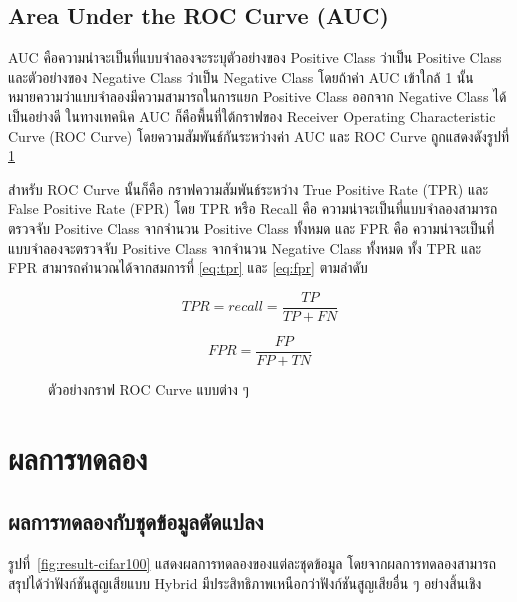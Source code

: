 \subsection{Area Under the ROC Curve (AUC)}
AUC คือความน่าจะเป็นที่แบบจำลองจะระบุตัวอย่างของ Positive Class ว่าเป็น Positive Class และตัวอย่างของ Negative Class ว่าเป็น Negative Class 
โดยถ้าค่า AUC เข้าใกล้ 1 นั้นหมายความว่าแบบจำลองมีความสามารถในการแยก Positive Class ออกจาก Negative Class ได้เป็นอย่างดี 
ในทางเทคนิค AUC ก็คือพื้นที่ใต้กราฟของ Receiver Operating Characteristic Curve (ROC Curve) โดยความสัมพันธ์กันระหว่างค่า AUC และ ROC Curve ถูกแสดงดังรูปที่ \ref{fig:roc} 

สำหรับ ROC Curve นั้นก็คือ กราฟความสัมพันธ์ระหว่าง True Positive Rate (TPR) และ False Positive Rate (FPR) โดย TPR หรือ Recall คือ 
ความน่าจะเป็นที่แบบจำลองสามารถตรวจจับ Positive Class จากจำนวน Positive Class ทั้งหมด และ FPR คือ 
ความน่าจะเป็นที่แบบจำลองจะตรวจจับ Positive Class จากจำนวน Negative Class ทั้งหมด ทั้ง TPR และ FPR สามารถคำนวณได้จากสมการที่ \ref{eq:tpr} และ \ref{eq:fpr} ตามลำดับ

\begin{equation}
  TPR = recall = \frac{TP}{TP + FN}
  \label{eq:tpr}
\end{equation}

\begin{equation}
  FPR = \frac{FP}{FP + TN}
  \label{eq:fpr}
\end{equation}

\begin{figure}[h]
  \centering
  \caption{ตัวอย่างกราฟ ROC Curve แบบต่าง ๆ}
  \label{fig:roc}
\end{figure}
\FloatBarrier

\section{ผลการทดลอง}
\subsection{ผลการทดลองกับชุดข้อมูลดัดแปลง}

รูปที่~\ref{fig:result-cifar100} แสดงผลการทดลองของแต่ละชุดข้อมูล โดยจากผลการทดลองสามารถสรุปได้ว่าฟังก์ชันสูญเสียแบบ Hybrid มีประสิทธิภาพเหนือกว่าฟังก์ชันสูญเสียอื่น ๆ อย่างสิ้นเชิง

